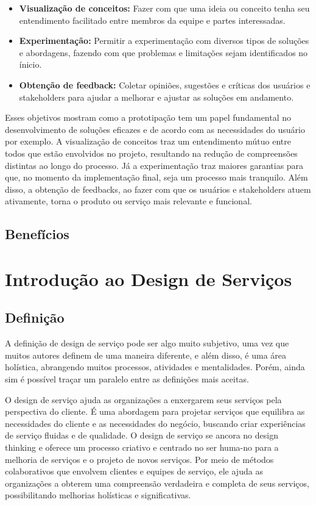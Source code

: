 \begin{itemize}
	\item \textbf{Visualização de conceitos:} Fazer com que uma ideia ou conceito tenha seu entendimento facilitado entre membros da equipe e partes interessadas.
	
	\item \textbf{Experimentação:} Permitir a experimentação com diversos tipos de soluções e abordagens, fazendo com que problemas e limitações sejam identificados no ínicio.
	
	\item \textbf{Obtenção de feedback:} Coletar opiniões, sugestões e críticas dos usuários e stakeholders para ajudar a melhorar e ajustar as soluções em andamento.
\end{itemize}

Esses objetivos mostram como a prototipação tem um papel fundamental no desenvolvimento de soluções eficazes e de acordo com as necessidades do usuário por exemplo. A visualização de conceitos traz um entendimento mútuo entre todos que estão envolvidos no projeto, resultando na redução de compreensões distintas ao longo do processo. Já a experimentação traz maiores garantias para que, no momento da implementação final, seja um processo mais tranquilo. Além disso, a obtenção de feedbacks, ao fazer com que os usuários e stakeholders atuem ativamente, torna o produto ou serviço mais relevante e funcional.

\subsection{Benefícios}

\section{Introdução ao Design de Serviços}

\subsection{Definição}

A definição de design de serviço pode ser algo muito subjetivo, uma vez que muitos autores definem de uma maneira diferente, e além disso, é uma área holística, abrangendo muitos processos, atividades e mentalidades. Porém, ainda sim é possível traçar um paralelo entre as definições mais aceitas.

O design de serviço ajuda as organizações a enxergarem seus serviços pela perspectiva do cliente. É uma abordagem para projetar serviços que equilibra as necessidades do cliente e as necessidades do negócio, buscando criar experiências de serviço fluidas e de qualidade. O design de serviço se ancora no design thinking e oferece um processo criativo e centrado no ser huma-no para a melhoria de serviços e o projeto de novos serviços. Por meio de métodos colaborativos que envolvem clientes e equipes de serviço, ele ajuda as organizações a obterem uma compreensão verdadeira e completa de seus serviços, possibilitando melhorias holísticas e significativas. \cite{Stickdorn2019}

